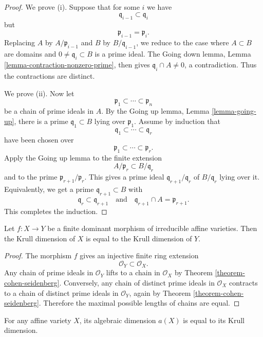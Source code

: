 \begin{proof}
We prove (i).
Suppose that for some $i$ we have
$$
\mathfrak{q}_{i-1}\subset \mathfrak{q}_i
$$
but
$$
\mathfrak{p}_{i-1}=\mathfrak{p}_i.
$$
Replacing $A$ by $A/\mathfrak{p}_{i-1}$
and $B$ by $B/\mathfrak{q}_{i-1}$,
we reduce to the case where $A\subset B$
are domains and
$0\neq \mathfrak{q}_i\subset B$
is a prime ideal.
The Going down lemma,
Lemma
\ref{lemma-contraction-nonzero-prime},
then gives
$\mathfrak{q}_i\cap A\neq 0$,
a contradiction.
Thus the contractions are distinct.

We prove (ii).
Now let
$$
\mathfrak{p}_1\subset \cdots
\subset \mathfrak{p}_n
$$
be a chain of prime ideals in $A$.
By the Going up lemma,
Lemma
\ref{lemma-going-up},
there is a prime
$\mathfrak{q}_1\subset B$ lying over
$\mathfrak{p}_1$.
Assume by induction that
$$
\mathfrak{q}_1\subset \cdots
\subset \mathfrak{q}_r
$$
have been chosen over
$$
\mathfrak{p}_1\subset \cdots
\subset \mathfrak{p}_r.
$$
Apply the Going up lemma to the finite
extension
$$
A/\mathfrak{p}_r
\subset B/\mathfrak{q}_r
$$
and to the prime
$\mathfrak{p}_{r+1}/\mathfrak{p}_r$.
This gives a prime ideal
$\mathfrak{q}_{r+1}/\mathfrak{q}_r$
of $B/\mathfrak{q}_r$ lying over it.
Equivalently, we get a prime
$\mathfrak{q}_{r+1}\subset B$
with
$$
\mathfrak{q}_r\subset \mathfrak{q}_{r+1}
\quad\text{and}\quad
\mathfrak{q}_{r+1}\cap A
=\mathfrak{p}_{r+1}.
$$
This completes the induction.
\end{proof}

\begin{lemma}
\label{lemma-krull-dimension-finite-dominant}
Let $f:X\to Y$ be a finite dominant
morphism of irreducible affine varieties.
Then the Krull dimension of $X$ is equal
to the Krull dimension of $Y$.
\end{lemma}

\begin{proof}
The morphism $f$ gives an injective finite
ring extension
$$
\mathcal{O}_Y\subset \mathcal{O}_X.
$$
Any chain of prime ideals in
$\mathcal{O}_Y$ lifts to a chain in
$\mathcal{O}_X$ by Theorem
\ref{theorem-cohen-seidenberg}.
Conversely, any chain of distinct prime
ideals in $\mathcal{O}_X$ contracts to a
chain of distinct prime ideals in
$\mathcal{O}_Y$, again by Theorem
\ref{theorem-cohen-seidenberg}.
Therefore the maximal possible lengths of
chains are equal.
\end{proof}

\begin{theorem}
\label{theorem-algebraic-dimension-krull}
For any affine variety $X$, its algebraic
dimension $a(X)$ is equal to its Krull
dimension.
\end{theorem}

